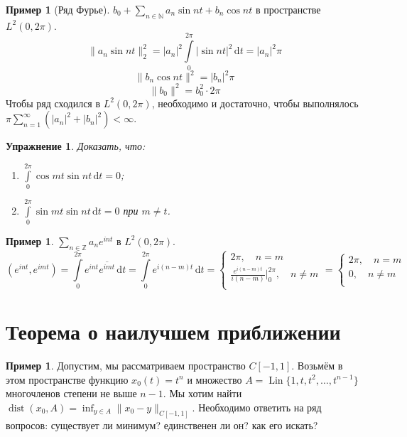 \documentclass[11pt,openany,a4paper]{scrartcl}
\theoremstyle{plain}
\newtheorem{exercise}[theorem]{Упражнение}
\theoremstyle{definition}
\newtheorem{example}[theorem]{Пример}
\newcommand\mb{\mathbb}
\newcommand{\dif}{\, \mathrm d}
\newcommand\ol{\overline}
\DeclareMathOperator{\dist}{dist}
\DeclareMathOperator{\Lin}{Lin}
\begin{document}
\begin{example}[Ряд Фурье]
    $b_0 + \sum\limits_{n \in \mb N}a_n\sin nt + b_n \cos nt$ в пространстве
    $L^2(0, 2\pi)$.
    $$
    \|a_n \sin nt\|_2^2 = |a_n|^2\int\limits_0^{2\pi}|\sin nt|^2\dif t =
    |a_n|^2\pi
    $$
    $$
    \|b_n\cos nt\|^2 = |b_n|^2 \pi
    $$
    $$
    \|b_0\|^2 = b_0^2\cdot 2\pi
    $$
    Чтобы ряд сходился в $L^2(0, 2\pi)$, необходимо и достаточно, чтобы 
    выполнялось $\pi\sum\limits_{n=1}^\infty(|a_n|^2 + |b_n|^2) < \infty$.
\end{example}
\begin{exercise}
    Доказать, что:
    \begin{enumerate}
        \item $\int\limits_0^{2\pi} \cos mt\sin nt \dif t = 0$;
        \item $\int\limits_0^{2\pi} \sin mt\sin nt \dif t = 0$ при $m \neq t$.
    \end{enumerate}
\end{exercise}

\begin{example}
    $\sum\limits_{n \in \mb Z} a_n e^{int}$ в $L^2(0, 2\pi)$.
    $$
    (e^{int}, e^{imt}) = \int\limits_0^{2\pi}e^{int}\ol{e^{imt}}\dif t =
     \int\limits_0^{2\pi} e^{i(n - m)t}\dif t =
     \begin{cases}
         2\pi,\quad n = m \\
         \frac{e^{i(n-m)t}}{i(n-m)}\bigg|_0^{2\pi},\quad n \neq m \\
     \end{cases} =
     \begin{cases}
         2\pi,\quad n = m \\
         0,\quad n \neq m \\
     \end{cases}
    $$
\end{example}

\section{Теорема о наилучшем приближении}

\begin{example}
    Допустим, мы рассматриваем пространство $C[-1, 1]$. Возьмём в этом
    пространстве функцию $x_0(t) = t^n$ и множество
    $A = \Lin\{1, t, t^2, \ldots, t^{n-1}\}$ многочленов степени не выше $n-1$.
    Мы хотим найти $\dist(x_0, A) = \inf_{y\in A}\|x_0 - y\|_{C[-1, 1]}$. 
    Необходимо ответить на ряд вопросов: существует ли минимум? единственен ли он?
    как его искать?
\end{example}
\end{document}
